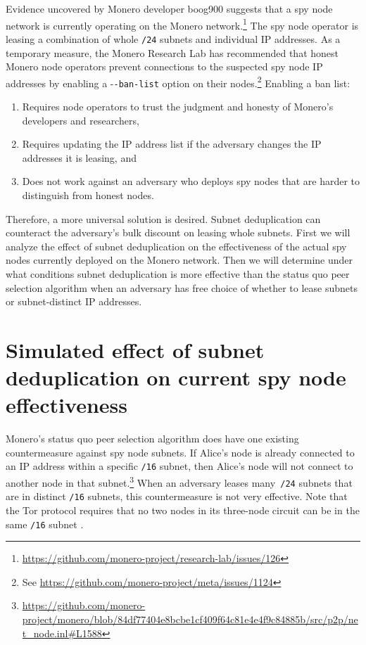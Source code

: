 \documentclass[usletter,11pt,english,openany]{article}
\begin{document}
Evidence uncovered by Monero developer boog900 suggests that a spy
node network is currently operating on the Monero network.\footnote{\href{https://github.com/monero-project/research-lab/issues/126}{https://github.com/monero-project/research-lab/issues/126}}
The spy node operator is leasing a combination of whole \texttt{/24}
subnets and individual IP addresses. As a temporary measure, the Monero
Research Lab has recommended that honest Monero node operators prevent
connections to the suspected spy node IP addresses by enabling a -{}\texttt{-ban-list}
option on their nodes.\footnote{See \href{https://github.com/monero-project/meta/issues/1124}{https://github.com/monero-project/meta/issues/1124}}
Enabling a ban list:
\begin{enumerate}
\item Requires node operators to trust the judgment and honesty of Monero's
developers and researchers,
\item Requires updating the IP address list if the adversary changes the
IP addresses it is leasing, and
\item Does not work against an adversary who deploys spy nodes that are
harder to distinguish from honest nodes.
\end{enumerate}
Therefore, a more universal solution is desired. Subnet deduplication
can counteract the adversary's bulk discount on leasing whole subnets.
First we will analyze the effect of subnet deduplication on the effectiveness
of the actual spy nodes currently deployed on the Monero network.
Then we will determine under what conditions subnet deduplication
is more effective than the status quo peer selection algorithm when
an adversary has free choice of whether to lease subnets or subnet-distinct
IP addresses.

\section{Simulated effect of subnet deduplication on current spy node effectiveness}

Monero's status quo peer selection algorithm does have one existing
countermeasure against spy node subnets. If Alice's node is already
connected to an IP address within a specific \texttt{/16} subnet,
then Alice's node will not connect to another node in that subnet.\footnote{\href{https://github.com/monero-project/monero/blob/84df77404e8bcbe1cf409f64c81e4e4f9c84885b/src/p2p/net_node.inl\#L1588}{https://github.com/monero-project/monero/blob/84df77404e8bcbe1cf409f64c81e4e4f9c84885b/src/p2p/net\_node.inl\#L1588}}
When an adversary leases many\texttt{ /24} subnets that are in distinct
\texttt{/16} subnets, this countermeasure is not very effective. Note
that the Tor protocol requires that no two nodes in its three-node
circuit can be in the same \texttt{/16} subnet \cite{Rochet2020}.
\end{document}
